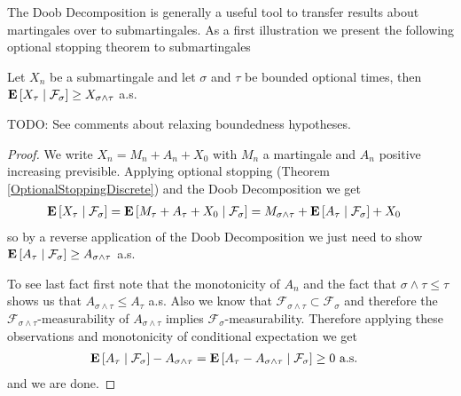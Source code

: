 The Doob Decomposition is generally a useful tool to transfer results
about martingales over to submartingales.  As a first illustration we
present the following optional
stopping theorem to submartingales
\begin{cor}\label{OptionalStoppingSubmartingaleDiscrete}Let $X_n$ be a submartingale and let $\sigma$ and $\tau$ be
  bounded optional times, then
  $\cexpectationlong{\mathcal{F}_\sigma}{X_\tau} \geq X_{\sigma \wedge
    \tau}$ a.s.

TODO: See comments about relaxing boundedness hypotheses.
\end{cor}
\begin{proof}
We write $X_n = M_n + A_n + X_0$ with $M_n$ a martingale and $A_n$ positive
increasing previsible.  Applying optional stopping (Theorem
\ref{OptionalStoppingDiscrete}) and the Doob Decomposition we get
\begin{align*}
\cexpectationlong{\mathcal{F}_\sigma}{X_\tau} &=
\cexpectationlong{\mathcal{F}_\sigma}{M_\tau + A_\tau + X_0} = M_{\sigma
  \wedge \tau} + \cexpectationlong{\mathcal{F}_\sigma}{A_\tau} + X_0
\end{align*}
so by a reverse application of the Doob Decomposition 
we just need to show $\cexpectationlong{\mathcal{F}_\sigma}{A_\tau}
\geq A_{\sigma \wedge \tau}$ a.s.

To see last fact first note that the monotonicity of $A_n$ and the
fact that $\sigma \wedge \tau \leq \tau$ shows us that $A_{\sigma
  \wedge \tau} \leq A_\tau$ a.s.  
Also we know that $\mathcal{F}_{\sigma \wedge
  \tau} \subset \mathcal{F}_\sigma$ and therefore the
$\mathcal{F}_{\sigma \wedge \tau}$-measurability of $A_{\sigma \wedge
  \tau}$ implies $\mathcal{F}_\sigma$-measurability.  Therefore
applying these observations and monotonicity of conditional
expectation we get
\begin{align*}
\cexpectationlong{\mathcal{F}_\sigma}{A_\tau} - A_{\sigma \wedge \tau}
&= \cexpectationlong{\mathcal{F}_\sigma}{A_\tau - A_{\sigma \wedge
    \tau}} \geq 0 \text{ a.s.}
\end{align*}
and we are done.
\end{proof}

